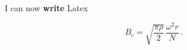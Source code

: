 I can now \textbf{write} Latex

\begin{equation}
B_c= \sqrt{\frac{\pi \rho}{2}} \, \frac{\omega^2 r}{N} \, .
\end{equation}